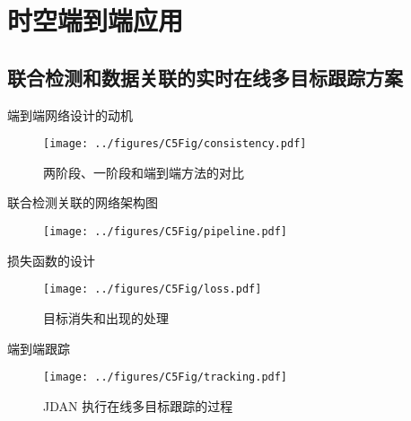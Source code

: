 \section{时空端到端应用}
\subsection{联合检测和数据关联的实时在线多目标跟踪方案}

\begin{frame}{端到端网络设计的动机}
	\begin{figure}[!t]
		\centering
		\texttt{[image: ../figures/C5Fig/consistency.pdf]}
		\caption{两阶段、一阶段和端到端方法的对比}
	\end{figure}
\end{frame}


\begin{frame}{联合检测关联的网络架构图}
	\begin{figure}[!t]
		\centering
		\texttt{[image: ../figures/C5Fig/pipeline.pdf]}
	\end{figure}
\end{frame}


\begin{frame}{损失函数的设计}
	\begin{figure}[!t]
		\centering
		\texttt{[image: ../figures/C5Fig/loss.pdf]}
		\caption{目标消失和出现的处理}
	\end{figure}
\end{frame}


\begin{frame}{端到端跟踪}
	\begin{figure}[!t]
		\centering
		\texttt{[image: ../figures/C5Fig/tracking.pdf]}
		\caption{JDAN 执行在线多目标跟踪的过程}
	\end{figure}
\end{frame}


